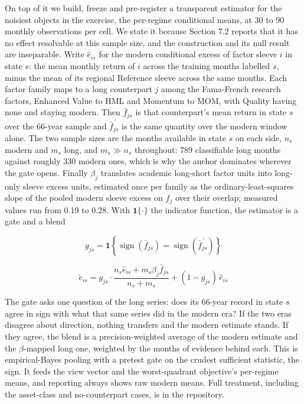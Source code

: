 \documentclass[12pt,letterpaper]{article}
\begin{document}
On top of it we build, freeze and pre-register a transparent estimator for the
noisiest objects in the exercise, the per-regime conditional means, at 30 to 90
monthly observations per cell. We state it because Section 7.2 reports that it has
no effect resolvable at this sample size, and the construction and its
null result are inseparable. Write $\hat{e}_{is}$ for the modern conditional excess of factor sleeve $i$ in state $s$:
the mean monthly return of $i$ across the training months labelled $s$, minus the mean of its
regional Reference sleeve across the same months. Each factor family maps to a long counterpart
$j$ among the Fama-French research factors, Enhanced Value to HML and Momentum to MOM, with
Quality having none and staying modern. Then $\bar{f}_{js}$ is that counterpart's mean return in
state $s$ over the 66-year sample and $\bar{f}^{\,\prime}_{js}$ is the same quantity over the
modern window alone. The two sample sizes are the months available in state $s$ on each side,
$n_s$ modern and $m_s$ long, and $m_s \gg n_s$ throughout: 789 classifiable long months against
roughly 330 modern ones, which is why the anchor dominates wherever the gate opens. Finally
$\beta_j$ translates academic long-short factor units into long-only sleeve excess units,
estimated once per family as the ordinary-least-squares slope of the pooled modern sleeve excess
on $f_j$ over their overlap; measured values run from 0.19 to 0.28. With $\mathbf{1}\{\cdot\}$
the indicator function, the estimator is a gate and a blend

\begin{equation}
g_{js} = \mathbf{1}\!\left\{ \operatorname{sign}(\bar{f}_{js})
       = \operatorname{sign}(\bar{f}^{\,\prime}_{js}) \right\}
\end{equation}

\begin{equation}
\tilde{e}_{is} = g_{js} \cdot
  \frac{n_s \hat{e}_{is} + m_s \beta_j \bar{f}_{js}}{n_s + m_s}
  + (1 - g_{js})\, \hat{e}_{is}
\end{equation}

The gate asks one question of the long series: does its 66-year record in state $s$ agree in
sign with what that same series did in the modern era? If the two eras disagree about direction,
nothing transfers and the modern estimate stands. If they agree, the blend is a precision-weighted
average of the modern estimate and the $\beta$-mapped long one, weighted by the months of evidence
behind each. This is empirical-Bayes pooling with a pretest gate on the crudest sufficient
statistic, the sign. It feeds the
\citet{black1992} view vector and the worst-quadrant objective's per-regime means,
and reporting always shows raw modern means. Full treatment, including the
asset-class and no-counterpart cases, is in the repository.
\end{document}
